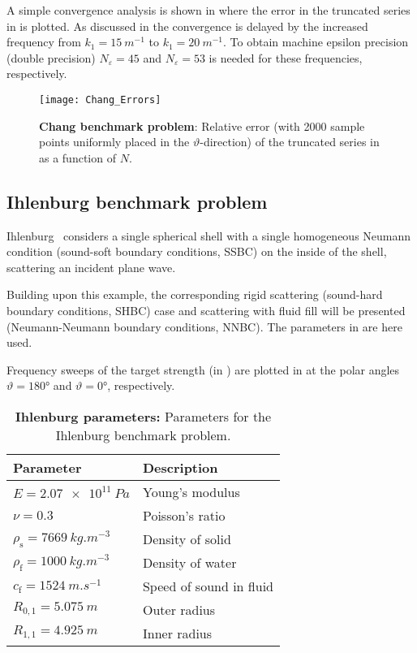 A simple convergence analysis is shown in  where the error in the truncated series in  is plotted. As discussed in  the convergence is delayed by the increased frequency from $k_1=\SI{15}{m^{-1}}$ to $k_1=\SI{20}{m^{-1}}$. To obtain machine epsilon precision (double precision) $N_\varepsilon=45$ and $N_\varepsilon=53$ is needed for these frequencies, respectively.
\begin{figure}
	\centering
	\texttt{[image: Chang\_Errors]}
	\caption{\textbf{Chang benchmark problem}: Relative error (with 2000 sample points uniformly placed in the $\vartheta$-direction) of the truncated series in  as a function of $N$.}
	\label{Fig1:ChangErrors}
\end{figure}

\subsection{Ihlenburg benchmark problem} 
Ihlenburg~\cite{Ihlenburg1998fea} considers a single spherical shell with a single homogeneous Neumann condition (sound-soft boundary conditions, SSBC) on the inside of the shell, scattering an incident plane wave. 

Building upon this example, the corresponding rigid scattering (sound-hard boundary conditions, SHBC) case and scattering with fluid fill will be presented (Neumann-Neumann boundary conditions, NNBC). The parameters in  are here used. 

Frequency sweeps of the target strength (in ) are plotted in  at the polar angles $\vartheta=\ang{180}$ and $\vartheta=\ang{0}$, respectively.
\begin{table}
	\centering
	\caption{\textbf{Ihlenburg parameters:} Parameters for the Ihlenburg benchmark problem.}
	\label{Tab1:IhlenburgParameters}
	\begin{tabular}{l l}
		\toprule
		Parameter & Description\\
		\midrule
		$E = \SI{2.07e11}{Pa}$ & Young's modulus\\
		$\nu = 0.3$ & Poisson's ratio\\
		$\rho_{\mathrm{s}} = \SI{7669}{kg.m^{-3}}$ & Density of solid\\
		$\rho_{\mathrm{f}} = \SI{1000}{kg.m^{-3}}$ & Density of water\\
		$c_{\mathrm{f}} = \SI{1524}{m.s^{-1}}$ & Speed of sound in fluid\\
		$R_{0,1}=\SI{5.075}{m}$ & Outer radius\\
		$R_{1,1}=\SI{4.925}{m}$ & Inner radius\\
		\bottomrule
	\end{tabular}
\end{table}

